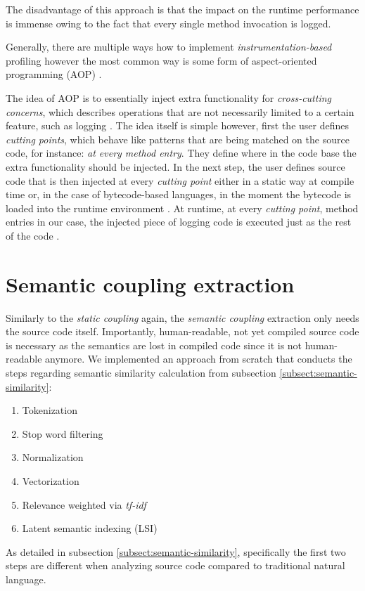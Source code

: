 \documentclass[12pt,a4paper]{report}
\begin{document}
The disadvantage of this approach is that the impact on the runtime performance
is immense owing to the fact that every single method invocation is logged.

Generally, there are multiple ways how to implement
\textit{instrumentation\hyp based} profiling however the most common way
is some form of aspect-oriented programming (AOP) \cite{kiczales1997aop}.

The idea of AOP is to essentially inject extra functionality for
\textit{cross-cutting concerns}, which describes operations that are not
necessarily limited to a certain feature, such as logging \cite{kiczales1997aop}.
The idea itself is simple however, first the user defines \textit{cutting points},
which behave like patterns that are being matched on the source code,
for instance: \textit{at every method entry}.
They define where in the code base the extra functionality should be injected.
In the next step, the user defines source code that is then injected at every
\textit{cutting point} either in a static way at compile time or,
in the case of bytecode\hyp based languages, in the moment the bytecode is loaded
into the runtime environment \cite{kiczales1997aop}.
At runtime, at every \textit{cutting point}, method entries in our case,
the injected piece of logging code is executed just as the rest of the code
\cite{kiczales1997aop}.



\section{Semantic coupling extraction}

Similarly to the \textit{static coupling} again, the \textit{semantic coupling}
extraction only needs the source code itself. Importantly, human-readable,
not yet compiled source code is necessary as the semantics are lost in compiled
code since it is not human-readable anymore.
We implemented an approach from scratch that conducts the  steps regarding
semantic similarity calculation from subsection \ref{subsect:semantic-similarity}:
\begin{enumerate}[noitemsep]
  \item Tokenization
  \item Stop word filtering
  \item Normalization
  \item Vectorization
  \item Relevance weighted via \textit{tf-idf}
  \item Latent semantic indexing (LSI)
\end{enumerate}
As detailed in subsection \ref{subsect:semantic-similarity},
specifically the first two steps are different when analyzing source code
compared to traditional natural language.
\end{document}
